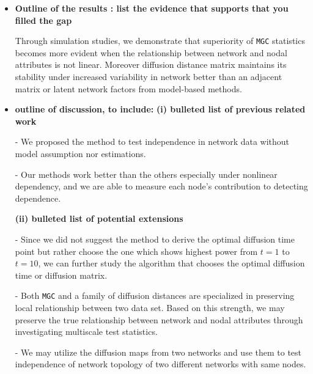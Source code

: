 \documentclass[12pt]{article}
\begin{document}
\begin{itemize}
\item  \textbf{Outline of the results : list the evidence that supports that you filled the gap}

 Through simulation studies, we demonstrate that superiority of \texttt{MGC} statistics becomes more evident when the relationship between network and nodal attributes is not linear. Moreover diffusion distance matrix maintains its stability under increased variability in network better than an adjacent matrix or latent network factors from model-based methods. 


\item  \textbf{outline of discussion, to include:}
\subitem \textbf{(i) bulleted list of previous related work}

-  We proposed the method to test independence in network data without model assumption nor estimations. 

- Our methods work better than the others especially under nonlinear dependency, and we are able to measure each node's contribution to detecting dependence.

\subitem \textbf{(ii) bulleted list of potential extensions} 

- Since we did not suggest the method to derive the optimal diffusion time point but rather choose the one which shows highest power from $t=1$ to $t=10$, we can further study the algorithm that chooses the optimal diffusion time or diffusion matrix. 

- Both \texttt{MGC} and a family of diffusion distances are specialized in preserving local relationship between two data set. Based on this strength, we may preserve the true relationship between network and nodal attributes through investigating multiscale test statistics.

- We may utilize the diffusion maps from two networks and use them to test independence of network topology of two different networks with same nodes. 
  

\end{itemize}
\end{document}
